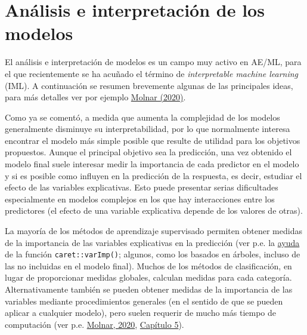 \documentclass[
]{book}
\theoremstyle{break}
\theoremstyle{definition}
\theoremstyle{definition}
\theoremstyle{definition}
\theoremstyle{definition}
\theoremstyle{remark}
\begin{document}
\hypertarget{analisis-modelos}{%
\section{Análisis e interpretación de los modelos}\label{analisis-modelos}}

El análisis e interpretación de modelos es un campo muy activo en AE/ML, para el que recientemente se ha acuñado el término de \emph{interpretable machine learning} (IML).
A continuación se resumen brevemente algunas de las principales ideas, para más detalles ver por ejemplo \href{https://christophm.github.io/interpretable-ml-book}{Molnar (2020)}.

Como ya se comentó, a medida que aumenta la complejidad de los modelos generalmente disminuye su interpretabilidad, por lo que normalmente interesa encontrar el modelo más simple posible que resulte de utilidad para los objetivos propuestos.
Aunque el principal objetivo sea la predicción, una vez obtenido el modelo final suele interesar medir la importancia de cada predictor en el modelo y si es posible como influyen en la predicción de la respuesta, es decir, estudiar el efecto de las variables explicativas.
Esto puede presentar serias dificultades especialmente en modelos complejos en los que hay interacciones entre los predictores (el efecto de una variable explicativa depende de los valores de otras).

La mayoría de los métodos de aprendizaje supervisado permiten obtener medidas de la importancia de las variables explicativas en la predicción (ver p.e. la \href{https://topepo.github.io/caret/variable-importance.html}{ayuda} de la función \texttt{caret::varImp()}; algunos, como los basados en árboles, incluso de las no incluidas en el modelo final).
Muchos de los métodos de clasificación, en lugar de proporcionar medidas globales, calculan medidas para cada categoría.
Alternativamente también se pueden obtener medidas de la importancia de las variables mediante procedimientos generales (en el sentido de que se pueden aplicar a cualquier modelo), pero suelen requerir de mucho más tiempo de computación (ver p.e. \href{https://christophm.github.io/interpretable-ml-book}{Molnar, 2020}, \href{https://christophm.github.io/interpretable-ml-book/agnostic.htm}{Capítulo 5}).
\end{document}
